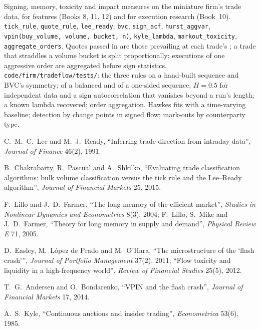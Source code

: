 \begin{build}
 Signing, memory, toxicity and impact measures on the miniature firm's trade data, for features (Books 8, 11, 12) and for
execution research (Book~10).
 \texttt{tick\_rule}, \texttt{quote\_rule}, \texttt{lee\_ready}, \texttt{bvc}, \texttt{sign\_acf}, \texttt{hurst\_aggvar},
\texttt{vpin(buy\_volume, volume, bucket, n)}, \texttt{kyle\_lambda}, \texttt{markout\_toxicity}, \texttt{aggregate\_orders}.
 Quotes passed in are those prevailing at each trade's ; a trade that straddles a volume bucket is split
proportionally; executions of one aggressive order are aggregated before sign statistics.
 \texttt{code/firm/tradeflow/tests/}: the three rules on a hand-built sequence and BVC's symmetry;  of a
balanced and of a one-sided sequence; $H = 0.5$ for independent data and a sign autocorrelation that vanishes beyond a run's length; a
known lambda recovered; order aggregation.
 Hawkes fits with a time-varying baseline;  detection by change points in signed flow; mark-outs by
counterparty type.
\end{build}

\begin{omsources}
\item C.~M.~C.~Lee and M.~J.~Ready, ``Inferring trade direction from intraday data'', \emph{Journal of Finance} 46(2), 1991.
\item B.~Chakrabarty, R.~Pascual and A.~Shkilko, ``Evaluating trade classification algorithms: bulk volume classification versus the tick rule
and the Lee--Ready algorithm'', \emph{Journal of Financial Markets} 25, 2015.
\item F.~Lillo and J.~D.~Farmer, ``The long memory of the efficient market'', \emph{Studies in Nonlinear Dynamics and Econometrics} 8(3), 2004;
F.~Lillo, S.~Mike and J.~D.~Farmer, ``Theory for long memory in supply and demand'', \emph{Physical Review E} 71, 2005.
\item D.~Easley, M.~López de Prado and M.~O'Hara, ``The microstructure of the `flash crash''', \emph{Journal of Portfolio Management}
37(2), 2011; ``Flow toxicity and liquidity in a high-frequency world'', \emph{Review of Financial Studies} 25(5), 2012.
\item T.~G.~Andersen and O.~Bondarenko, ``VPIN and the flash crash'', \emph{Journal of Financial Markets} 17, 2014.
\item A.~S.~Kyle, ``Continuous auctions and insider trading'', \emph{Econometrica} 53(6), 1985.
\end{omsources}

